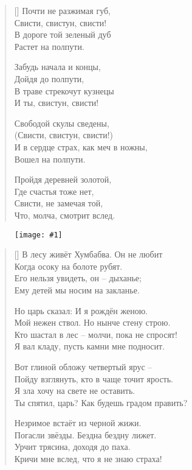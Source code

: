 \documentclass[12pt,a5paper,twoside]{article}
\newcommand{\pict}[1]{\thispagestyle{empty}\begin{figure}[H]\begin{center}\texttt{[image: \#1]}\end{center}\end{figure}\newpage}
\begin{document}
\settowidth{\versewidth}{Почти не разжимая губ,}
\begin{verse}[\versewidth]
Почти не разжимая губ,\\
Свисти, свистун, свисти!\\
В дороге той зеленый дуб\\
Растет на полпути.

Забудь начала и концы,\\
Дойдя до полпути,\\
В траве стрекочут кузнецы\\
И ты, свистун, свисти!

Свободой скулы сведены,\\
(Свисти, свистун, свисти!)\\
И в сердце страх, как меч в ножны,\\
Вошел на полпути.

Пройдя деревней золотой,\\
Где счастья тоже нет,\\
Свисти, не замечая той,\\
Что, молча, смотрит вслед.
\end{verse}
\newpage

\pict{picts/o_vse_vidavshem} 
	
\settowidth{\versewidth}{В лесу живёт Хумбабва. Он не любит}
\begin{verse}[\versewidth]
В лесу живёт Хумбабва. Он не любит\\
Когда осоку на болоте рубят.\\
Его нельзя увидеть, он – дыханье;\\
Ему детей мы носим на закланье.

Но царь сказал: И я рождён женою.\\
Мой нежен ствол. Но нынче стену строю.\\
Кто шастал в лес – молчи, пока не спросят!\\
Я вал кладу, пусть камни мне подносит.

Вот глиной обложу четвертый ярус –\\
Пойду взглянуть, кто в чаще точит ярость.\\
Я зла хочу на свете не оставить.\\
Ты спятил, царь? Как будешь градом править?

Незримое встаёт из черной жижи.\\
Погасли звёзды. Бездна бездну лижет.\\
Урчит трясина, доходя до паха.\\
Кричи мне вслед, что я не знаю страха!
\end{verse}
\newpage
\end{document}
